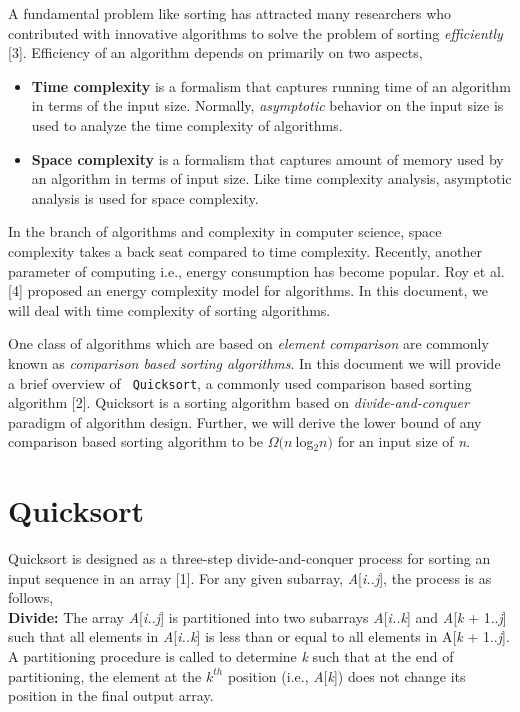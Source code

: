 \documentclass[a4paper, 10pt,twocolumn]{article}
\begin{document}
A fundamental problem like sorting has attracted many researchers who contributed with innovative algorithms to solve the problem of sorting \textit{efficiently} [3]. Efficiency of an algorithm depends on primarily on two aspects,
\begin{itemize}
    \item \textbf{Time complexity} is a formalism that captures running time of an algorithm in terms of the input size. Normally, \textit{asymptotic} behavior on the input size is used to analyze the time complexity of algorithms.
    \item \textbf{Space complexity} is a formalism that captures amount of memory used by an algorithm in terms of input size. Like time complexity analysis, asymptotic analysis is used for space complexity.
\end{itemize}
In the branch of algorithms and complexity in computer science, space complexity takes a back seat compared to time complexity. Recently, another parameter of computing i.e., energy consumption has become popular. Roy et al. [4] proposed an energy complexity model for algorithms. In this document, we will deal with time complexity of sorting algorithms.

One class of algorithms which are based on \textit{element comparison} are commonly known as \textit{comparison based sorting algorithms}. In this document we will provide a brief overview of \texttt{ Quicksort}, a commonly used comparison based sorting algorithm [2]. Quicksort is a sorting algorithm based on \textit{divide-and-conquer} paradigm of algorithm design. Further, we will derive the lower bound of any comparison based sorting algorithm to be $ \Omega(\textit{n} \ $log$_2\textit{n}) $ for an input size of \textit{n}.



\section{Quicksort}
Quicksort is designed as a three-step divide-and-conquer process for sorting an input sequence in
an array [1]. For any given subarray, \textit{A}[\textit{i..j}], the process is as follows,\\
\textbf{Divide:} The array \textit{A}[\textit{i..j}] is partitioned into two subarrays \textit{A}[\textit{i..k}] and \textit{A}[\textit{k} + 1..\textit{j}] such that all elements in \textit{A}[\textit{i..k}] is less than or equal to all elements in A[\textit{k} + 1..\textit{j}]. A partitioning procedure is called to determine \textit{k} such that at the end of partitioning, the element at the \textit{$k^{th}$} position (i.e., \textit{A}[\textit{k}]) does not change its position in the final output array.
\end{document}
